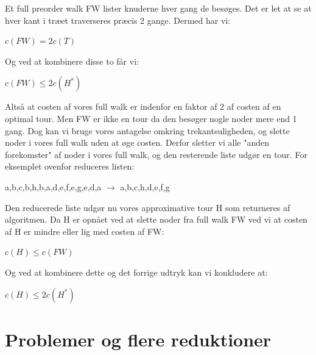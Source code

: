 \documentclass{article}
\begin{document}
Et full preorder walk FW lister knuderne hver gang de besøges. Det er let at se at hver kant i træet traverseres præcis 2 gange. Dermed har vi:
\begin{center}
	$c(FW) = 2c(T)$
\end{center}
Og ved at kombinere disse to får vi:
\begin{center}
	$c(FW) \le 2c(H^*)$ 
\end{center}
Altså at costen af vores full walk er indenfor en faktor af  2 af costen af en optimal tour. Men FW er ikke en tour da den besøger nogle noder mere end 1 gang. Dog kan vi bruge vores antagelse omkring trekantsuligheden, og slette noder i vores full walk uden at øge costen. Derfor sletter vi alle "anden forekomster" af noder i vores full walk, og den resterende liste udgør en tour. For eksemplet ovenfor reduceres listen:
\begin{center}
	a,b,c,b,h,b,a,d,e,f,e,g,e,d,a $\rightarrow$ a,b,c,h,d,e,f,g
\end{center}
Den reducerede liste udgør nu vores approximative tour H som returneres af algoritmen. Da H er opnået ved at slette noder fra full walk FW ved vi at costen af H er mindre eller lig med costen af FW:
\begin{center}
	$c(H) \le c(FW)$
\end{center}
Og ved at kombinere dette og det forrige udtryk kan vi konkludere at:
\begin{center}
	$c(H) \le 2c(H^*)$
\end{center}
\section{Problemer og flere reduktioner}

\end{document}
